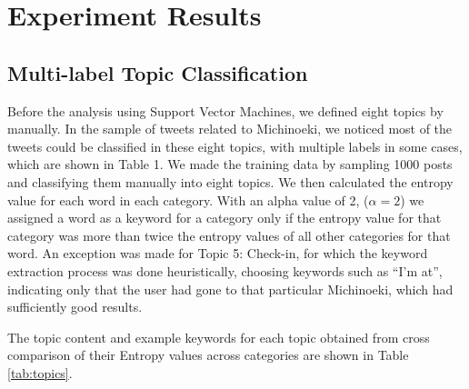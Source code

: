 \documentclass[review]{elsarticle}
\begin{document}
\section{Experiment Results}\label{experiments}

\subsection{Multi-label Topic Classification}\label{exp_topics}

Before the analysis using Support Vector Machines, we defined eight topics by manually. In the sample of tweets related to Michinoeki, we noticed most of the tweets could be classified in these eight topics, with multiple labels in some cases, which are shown in Table 1. We made the training data by sampling 1000 posts and classifying them manually into eight topics. We then calculated the entropy value for each word in each category. With an alpha value of 2, (\(\alpha=2\)) we assigned a word as a keyword for a category only if the entropy value for that category was more than twice the entropy values of all other categories for that word. An exception was made for Topic 5: Check-in, for which the keyword extraction process was done heuristically, choosing keywords such as “I’m at”, indicating only that the user had gone to that particular Michinoeki, which had sufficiently good results.

The topic content and example keywords for each topic obtained from cross comparison of their Entropy values across categories are shown in Table \ref{tab:topics}. 
\end{document}
